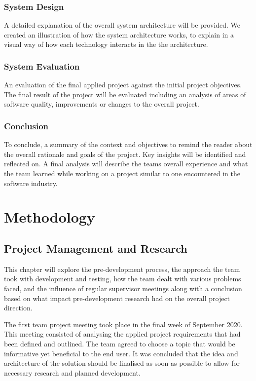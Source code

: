 \subsection{System Design}
A detailed explanation of the overall system architecture will be provided. We created an illustration of how the system architecture works, to explain in a visual way of how each technology interacts in the the architecture.

\subsection{System Evaluation}
An evaluation of the final applied project against the initial project objectives. The final result of the project will be evaluated including an analysis of areas of software quality, improvements or changes to the overall project.

\subsection{Conclusion}
To conclude, a summary of the context and objectives to remind the reader about the overall rationale and goals of the project. Key insights will be identified and reflected on. A final analysis will describe the teams overall experience and what the team learned while working on a project similar to one encountered in the software industry.

\chapter{Methodology}
\section{Project Management and Research}
This chapter will explore the pre-development process, the approach the team took with development and testing, how the team dealt with various problems faced, and the influence of regular supervisor meetings along with a conclusion based on what impact pre-development research had on the overall project direction.

\vspace{5mm} %

The first team project meeting took place in the final week of September 2020. This meeting consisted of analysing the applied project requirements that had been defined and outlined. The team agreed to choose a topic that would be informative yet beneficial to the end user. It was concluded that the idea and architecture of the solution should be finalised as soon as possible to allow for necessary research and planned development.


